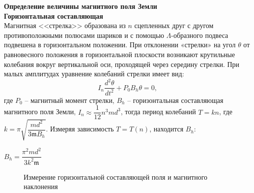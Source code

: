 \documentclass[a4paper, 12pt]{article}%
\begin{document}
	\textbf{Определение величины магнитного поля Земли}\\
	
	\textbf{Горизонтальная составляющая}\\

	Магнитная <<стрелка>> образована из $n$ сцепленных друг с другом противоположными полюсами шариков и с помощью $\Lambda$-образного подвеса подвешена в горизонтальном положении. При отклонении «стрелки» на угол $\theta$ от равновесного положения в горизонтальной плоскости возникают крутильные колебания вокруг вертикальной оси, проходящей через середину стрелки. При малых амплитудах уравнение колебаний
	стрелки имеет вид:
	$$
	I_n \dfrac{d^2 \theta}{dt^2} + P_0 B_h \theta = 0,
	$$ 
	где $P_0$ -- магнитный момент стрелки, $B_h$ -- горизонтальная составляющая магнитного поля Земли, $I_n \approx \dfrac{1}{12}n^3 m d^3$, тогда период колебаний $T = kn$, где $k = \pi \sqrt{\dfrac{md^2}{3\mathfrak m B_h}}$. Измеряя зависимость $T=T(n)$, находится $B_h$:
	\begin{center}
		{$B_h = \dfrac{\pi^2 m d^2}{3k^2 \mathfrak m}$}
	\end{center}
	\begin{figure}[h]
	\caption{Измерение горизонтальной составляющей поля и магнитного наклонения}
\end{figure}
	
\end{document}
